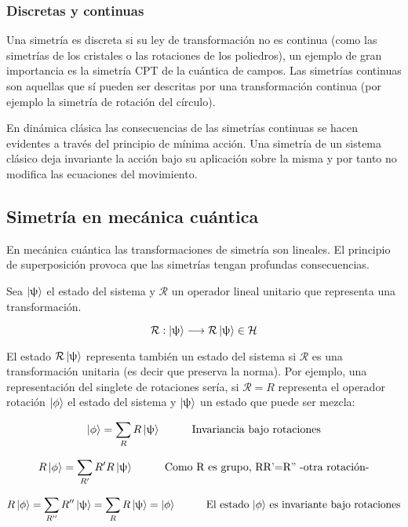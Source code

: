 \subsubsection{Discretas y continuas}

Una simetría es discreta si su ley de transformación no es continua (como las simetrías de los cristales o las rotaciones de los poliedros), un ejemplo de gran importancia es la simetría CPT de la cuántica de campos. Las simetrías continuas son aquellas que sí pueden ser descritas por una transformación continua (por ejemplo la simetría de rotación del círculo).

\smallskip
En dinámica clásica las consecuencias de las simetrías continuas se hacen evidentes a través del principio de mínima acción. Una simetría de un sistema clásico deja invariante la acción bajo su aplicación sobre la misma y por tanto no modifica las ecuaciones del movimiento.

\subsection{Simetría en mecánica cuántica}

En mecánica cuántica las transformaciones de simetría son lineales. El principio de superposición  provoca que las simetrías tengan profundas consecuencias.

Sea $\ket{\uppsi}$ el estado del sistema y $\mathcal{R}$ un operador lineal unitario que representa una transformación.

$$\mathcal{R}:\ket{\uppsi}\longrightarrow \mathcal{R}\ket{\uppsi}\in \mathcal{H}$$

El estado $\mathcal{R}\ket{\uppsi}$ representa también un estado del sistema si $\mathcal{R}$ es una transformación unitaria (es decir que preserva la norma). Por ejemplo, una representación del singlete de rotaciones sería, si $\mathcal{R}=R$ representa el operador rotación $\ket{\phi}$ el estado del sistema y $\ket{\uppsi}$ un estado que puede ser mezcla:

$$\ket{\phi} = \sum _R R\ket{\uppsi} \hspace{1cm} \text{Invariancia bajo rotaciones}$$

$$R\ket{\phi}=\sum _{R'}R'R\ket{\uppsi} \hspace{1cm} \text{Como R es grupo, RR'=R'' -otra rotación-}$$

$$R\ket{\phi}= \sum _{R''}R''\ket{\uppsi}=\sum _R R\ket{\uppsi}=\ket{\phi} \hspace{1cm} \text{El estado $\ket{\phi}$ es invariante bajo rotaciones}$$


